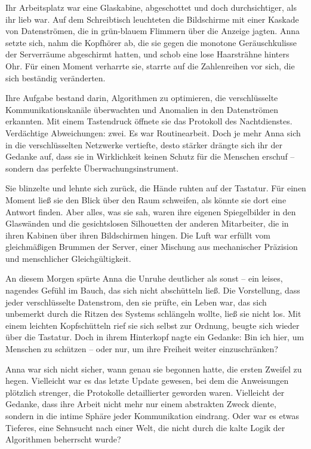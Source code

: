 \documentclass[
]{article}
\begin{document}
Ihr Arbeitsplatz war eine Glaskabine, abgeschottet und doch durchsichtiger, als ihr lieb war. Auf dem Schreibtisch leuchteten die Bildschirme mit einer Kaskade von Datenströmen, die in grün-blauem Flimmern über die Anzeige jagten. Anna setzte sich, nahm die Kopfhörer ab, die sie gegen die monotone Geräuschkulisse der Serverräume abgeschirmt hatten, und schob eine lose Haarsträhne hinters Ohr. Für einen Moment verharrte sie, starrte auf die Zahlenreihen vor sich, die sich beständig veränderten.

Ihre Aufgabe bestand darin, Algorithmen zu optimieren, die verschlüsselte Kommunikationskanäle überwachten und Anomalien in den Datenströmen erkannten. Mit einem Tastendruck öffnete sie das Protokoll des Nachtdienstes. Verdächtige Abweichungen: zwei. Es war Routinearbeit. Doch je mehr Anna sich in die verschlüsselten Netzwerke vertiefte, desto stärker drängte sich ihr der Gedanke auf, dass sie in Wirklichkeit keinen Schutz für die Menschen erschuf -- sondern das perfekte Überwachungsinstrument.

Sie blinzelte und lehnte sich zurück, die Hände ruhten auf der Tastatur. Für einen Moment ließ sie den Blick über den Raum schweifen, als könnte sie dort eine Antwort finden. Aber alles, was sie sah, waren ihre eigenen Spiegelbilder in den Glaswänden und die gesichtslosen Silhouetten der anderen Mitarbeiter, die in ihren Kabinen über ihren Bildschirmen hingen. Die Luft war erfüllt vom gleichmäßigen Brummen der Server, einer Mischung aus mechanischer Präzision und menschlicher Gleichgültigkeit.

An diesem Morgen spürte Anna die Unruhe deutlicher als sonst -- ein leises, nagendes Gefühl im Bauch, das sich nicht abschütteln ließ. Die Vorstellung, dass jeder verschlüsselte Datenstrom, den sie prüfte, ein Leben war, das sich unbemerkt durch die Ritzen des Systems schlängeln wollte, ließ sie nicht los. Mit einem leichten Kopfschütteln rief sie sich selbst zur Ordnung, beugte sich wieder über die Tastatur. Doch in ihrem Hinterkopf nagte ein Gedanke: Bin ich hier, um Menschen zu schützen -- oder nur, um ihre Freiheit weiter einzuschränken?

Anna war sich nicht sicher, wann genau sie begonnen hatte, die ersten Zweifel zu hegen. Vielleicht war es das letzte Update gewesen, bei dem die Anweisungen plötzlich strenger, die Protokolle detaillierter geworden waren. Vielleicht der Gedanke, dass ihre Arbeit nicht mehr nur einem abstrakten Zweck diente, sondern in die intime Sphäre jeder Kommunikation eindrang. Oder war es etwas Tieferes, eine Sehnsucht nach einer Welt, die nicht durch die kalte Logik der Algorithmen beherrscht wurde?
\end{document}
